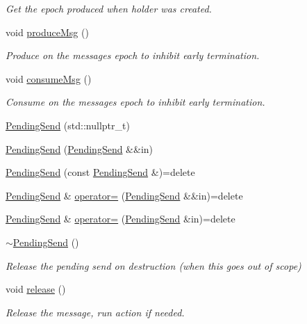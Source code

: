 \begin{DoxyCompactItemize}
\begin{DoxyCompactList}\small\item\em Get the epoch produced when holder was created. \end{DoxyCompactList}\item 
void \hyperlink{structvt_1_1messaging_1_1_pending_send_af5961bb21b4a427732be91ac699d570b}{produce\+Msg} ()
\begin{DoxyCompactList}\small\item\em Produce on the messages epoch to inhibit early termination. \end{DoxyCompactList}\item 
void \hyperlink{structvt_1_1messaging_1_1_pending_send_a0f249a127a798ba0823fae82c925ed3b}{consume\+Msg} ()
\begin{DoxyCompactList}\small\item\em Consume on the messages epoch to inhibit early termination. \end{DoxyCompactList}\item 
\hyperlink{structvt_1_1messaging_1_1_pending_send_a129a9c509eacf26111013105affe5931}{Pending\+Send} (std\+::nullptr\+\_\+t)
\item 
\hyperlink{structvt_1_1messaging_1_1_pending_send_a20551a473781d22c7ccfb6664d88e0ef}{Pending\+Send} (\hyperlink{structvt_1_1messaging_1_1_pending_send}{Pending\+Send} \&\&in)
\item 
\hyperlink{structvt_1_1messaging_1_1_pending_send_a951912c336cf3cdaf91f8ccde13092af}{Pending\+Send} (const \hyperlink{structvt_1_1messaging_1_1_pending_send}{Pending\+Send} \&)=delete
\item 
\hyperlink{structvt_1_1messaging_1_1_pending_send}{Pending\+Send} \& \hyperlink{structvt_1_1messaging_1_1_pending_send_aecef2d10d22564d142b9de52a57d81c8}{operator=} (\hyperlink{structvt_1_1messaging_1_1_pending_send}{Pending\+Send} \&\&in)=delete
\item 
\hyperlink{structvt_1_1messaging_1_1_pending_send}{Pending\+Send} \& \hyperlink{structvt_1_1messaging_1_1_pending_send_addfa1d51e3b8f272b5e711867e893bca}{operator=} (\hyperlink{structvt_1_1messaging_1_1_pending_send}{Pending\+Send} \&in)=delete
\item 
\hyperlink{structvt_1_1messaging_1_1_pending_send_ade803ff2903a92eaf62b6e330593871b}{$\sim$\+Pending\+Send} ()
\begin{DoxyCompactList}\small\item\em Release the pending send on destruction (when this goes out of scope) \end{DoxyCompactList}\item 
void \hyperlink{structvt_1_1messaging_1_1_pending_send_ad4b41412f953dcd22b3e3020a812f757}{release} ()
\begin{DoxyCompactList}\small\item\em Release the message, run action if needed. \end{DoxyCompactList}\end{DoxyCompactItemize}


